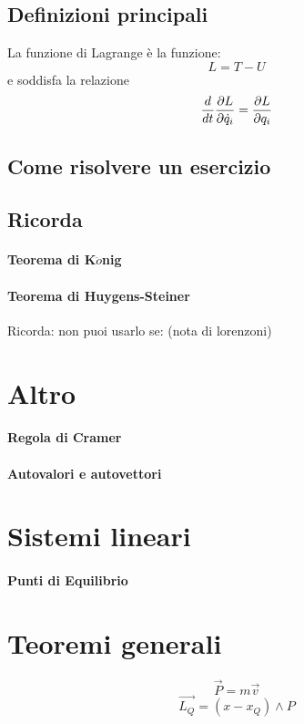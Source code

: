 \documentclass[a4paper,12pt]{article}
\begin{document}
\subsection{Definizioni principali}
La funzione di Lagrange è la funzione:
$$ L = T - U $$
e soddisfa la relazione
$${d \over dt}\dfrac{\partial L}{\partial\dot{q}_i} = \dfrac{\partial L}{\partial q_i}$$
\subsection{Come risolvere un esercizio}

\subsection{Ricorda}
\paragraph{Teorema di K$\ddot{o}$nig}

\paragraph{Teorema di Huygens-Steiner}
Ricorda: non puoi usarlo se: (nota di lorenzoni)

\section{Altro}
\paragraph{Regola di Cramer}
\paragraph{Autovalori e autovettori}

\section{Sistemi lineari}
\paragraph{Punti di Equilibrio}

\section{Teoremi generali}
\paragraph{}
$$
\vec{P} = m\vec{v}$$
$$
\vec{L_Q} = (x-x_Q)\wedge P
$$
\end{document}
